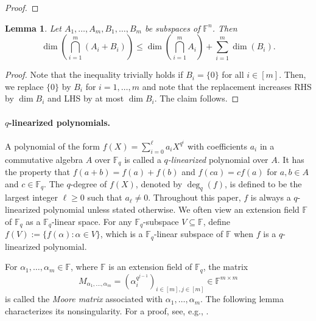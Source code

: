 \documentclass[11pt]{article}
\theoremstyle{plain}
\newtheorem{lemma}[thm]{Lemma}
\theoremstyle{definition}
\theoremstyle{remark}
\newcommand{\F}{\mathbb{F}}
\begin{document}
\begin{proof}
\end{proof}

\begin{lemma}\label{lm:dim}
Let $A_1,\ldots,A_m,B_1,\ldots,B_m$ be subspaces of $\F^n$. Then 
\[
\dim\left(\bigcap_{i=1}^m (A_i+B_i)\right)\leq \dim\left(\bigcap_{i=1}^m A_i\right)+\sum_{i=1}^m \dim(B_i).
\]
\end{lemma}
\begin{proof}
Note that the inequality trivially holds if $B_i=\{0\}$ for all $i\in [m]$. 
Then, we replace $\{0\}$ by $B_i$ for $i=1,\dots,m$ and note that the replacement increases RHS by $\dim B_i$ and LHS by at most $\dim B_i$. The claim follows.
\end{proof}

\paragraph{$q$-linearized polynomials.}

A polynomial of the form $f(X)=\sum_{i=0}^{\ell}a_iX^{q^i}$ with coefficients $a_i$ in a commutative algebra $A$ over $\F_q$ is called a \emph{$q$-linearized} polynomial over $A$. 
It has the property that $f(a+b)=f(a)+f(b)$ and $f(ca)=cf(a)$ for $a,b\in A$ and $c\in\F_q$.
The $q$-degree of $f(X)$, denoted by $\deg_q(f)$, is defined to be the largest integer $\ell\geq 0$ such that $a_{\ell}\neq 0$. Throughout this paper, $f$ is always a $q$-linearized polynomial unless stated otherwise. We often view an extension field $\F$ of $\F_q$ as a $\F_q$-linear space. For any $\F_q$-subspace $V\subseteq \F$, define $f(V):=\{f(\alpha):\alpha\in V\}$, which is a $\F_q$-linear subspace of $\F$ when $f$ is a $q$-linearized polynomial. 

For $\alpha_1,\dots,\alpha_m\in \F$, where $\F$ is an extension field of $\F_q$, the matrix 
\[
M_{\alpha_1,\dots,\alpha_m}=\left(\alpha_i^{q^{j-1}}\right)_{i\in [m], j\in [m]}\in\F^{m\times m}
\]
is called the \emph{Moore matrix} associated with $\alpha_1,\dots,\alpha_m$. The following lemma characterizes its nonsingularity. For a proof, see, e.g., \cite[Lemma~1.3.3]{Goss}.
\end{document}
